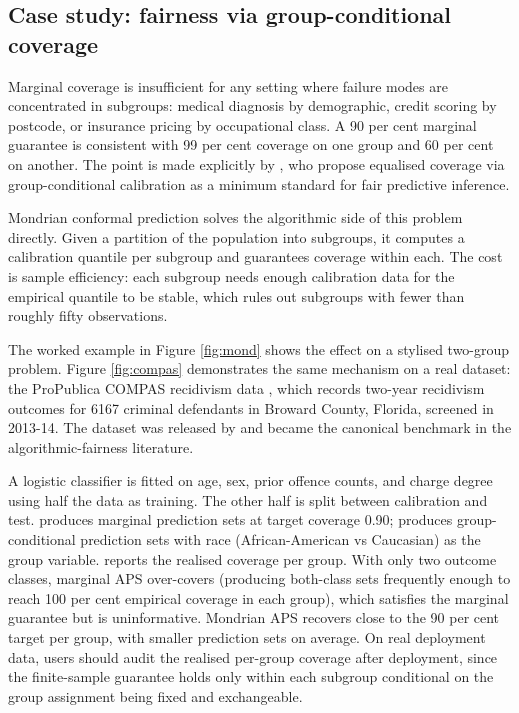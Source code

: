 \subsection{Case study: fairness via group-conditional
coverage}\label{case-study-fairness-via-group-conditional-coverage}

Marginal coverage is insufficient for any setting where failure modes
are concentrated in subgroups: medical diagnosis by demographic, credit
scoring by postcode, or insurance pricing by occupational class. A 90
per cent marginal guarantee is consistent with 99 per cent coverage on
one group and 60 per cent on another. The point is made explicitly by
\citet{romano2020malice}, who propose equalised coverage via
group-conditional calibration as a minimum standard for fair predictive
inference.

Mondrian conformal prediction solves the algorithmic side of this
problem directly. Given a partition of the population into subgroups, it
computes a calibration quantile per subgroup and guarantees coverage
within each. The cost is sample efficiency: each subgroup needs enough
calibration data for the empirical quantile to be stable, which rules
out subgroups with fewer than roughly fifty observations.

The worked example in Figure \ref{fig:mond} shows the effect on a
stylised two-group problem. Figure \ref{fig:compas} demonstrates the
same mechanism on a real dataset: the ProPublica COMPAS recidivism data
\citep{angwin2016machine}, which records two-year recidivism outcomes
for 6167 criminal defendants in Broward County, Florida, screened in
2013-14. The dataset was released by \citet{angwin2016machine} and
became the canonical benchmark in the algorithmic-fairness literature.

A logistic classifier is fitted on age, sex, prior offence counts, and
charge degree using half the data as training. The other half is split
between calibration and test.  produces marginal
prediction sets at target coverage 0.90;
 produces group-conditional
prediction sets with race (African-American vs Caucasian) as the group
variable.  reports the realised coverage per
group. With only two outcome classes, marginal APS over-covers
(producing both-class sets frequently enough to reach 100 per cent
empirical coverage in each group), which satisfies the marginal
guarantee but is uninformative. Mondrian APS recovers close to the 90
per cent target per group, with smaller prediction sets on average. On
real deployment data, users should audit the realised per-group coverage
after deployment, since the finite-sample guarantee holds only within
each subgroup conditional on the group assignment being fixed and
exchangeable.


